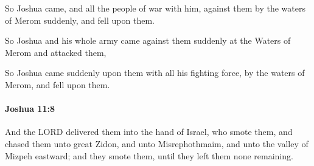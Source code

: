 			\begin{versebox}
					\item[BHS] 
					\item[ASV] So Joshua came, and all the people of war with him, against them by the waters of Merom suddenly, and fell upon them.
					\item[NIV] So Joshua and his whole army came against them suddenly at the Waters of Merom and attacked them,
					\item[NRSV] So Joshua came suddenly upon them with all his fighting force, by the waters of Merom, and fell upon them.
			\end{versebox}

		\paragraph{Joshua 11:8} %
			\label{JOSHUA-11-8}

			And the LORD delivered them into the hand of Israel, who smote them, and chased them unto great Zidon, and unto Misrephothmaim, and unto the valley of Mizpeh eastward; and they smote them, until they left them none remaining.

